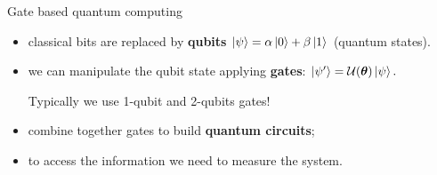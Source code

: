 \documentclass[aspectratio=169, 8pt, xcolor={svgnames}, hyperref={linkcolor=black}]{beamer}
\begin{document}
\begin{frame}{Gate based quantum computing}
        \begin{itemize}[noitemsep]
           \item<1,2,3,4>[1.] classical bits are replaced by \textbf{qubits}
           $ \ket{\psi} = \alpha\ket{0}+\beta\ket{1}$ (quantum states).
           \item<2,3,4>[2.] we can manipulate the qubit state applying \textbf{gates}: $\ket{\psi'}=\mathcal{U}(\bm{\theta})\ket{\psi}.$

           Typically we use 1-qubit and 2-qubits gates!
           \item<3,4>[3.] combine together gates to build \textbf{quantum circuits};
           \item<4>[4.] to access the information we need to measure the system.
        \end{itemize}
        \begin{figure}
        \end{figure}        
\end{frame}
\end{document}
